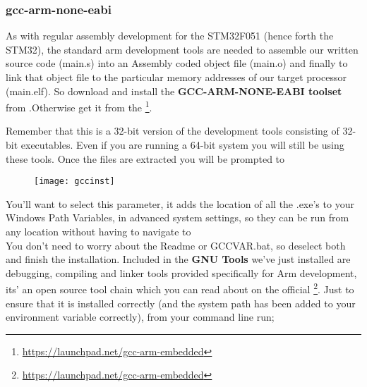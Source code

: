\subsubsection{gcc-arm-none-eabi}
\label{subsec:gccinst}
As with regular assembly development for the STM32F051 (hence forth the STM32), the standard arm development tools are needed to assemble our written source code (main.s) into an Assembly coded object file (main.o) and finally to link that object file to the particular memory addresses of our target processor (main.elf). 
So download and install the \textbf{\color{Brown} GCC-ARM-NONE-EABI toolset} from \href{https://vula.uct.ac.za/x/m9Z91P}{\color{Blue} \underline{}}.Otherwise get it from the  \href{https://launchpad.net/gcc-arm-embedded}{\color{Blue}\underline{}}   \hspace{1pt}\footnote{\url{https://launchpad.net/gcc-arm-embedded}}.
\par
Remember that this is a 32-bit version of the development tools consisting of 32-bit executables. Even if you are running a 64-bit system you will still be using these tools. Once the files are extracted you will be prompted to 
\begin{figure}[hbtp]
\centering
\texttt{[image: gccinst]}
\end{figure}
\newpage
You'll want to select this parameter, it adds the location of all the .exe's to your Windows Path Variables, in advanced system settings, so they can be run from any location without having to navigate to 
\\
You don't need to worry about the Readme or GCCVAR.bat, so deselect both and finish the installation. Included in the \textbf{\color{Brown} GNU Tools} we've just installed are debugging, compiling and linker tools provided specifically for Arm development, its' an open source tool chain which you can read about on the official \href{https://launchpad.net/gcc-arm-embedded}{\color{Blue} \underline{}}\hspace{1pt}\footnote{\url{https://launchpad.net/gcc-arm-embedded}}. Just to ensure that it is installed correctly (and the system path has been added to your environment variable correctly), from your command line run;
\\
